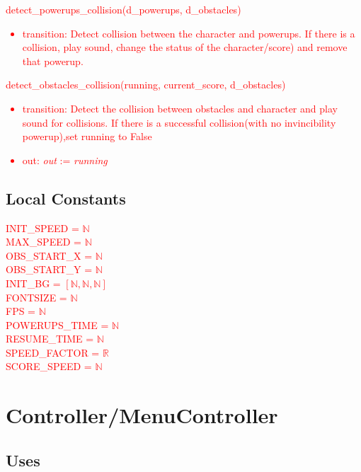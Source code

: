 \documentclass[12pt]{article}
\begin{document}
\noindent \textcolor{red}{
detect\_powerups\_collision(d\_powerups, d\_obstacles)
\begin{itemize}
    \item transition: Detect collision between the character and powerups. If there is a collision, play sound, change the status of the character/score) and remove that powerup.
\end{itemize}}

\noindent \textcolor{red}{
detect\_obstacles\_collision(running, current\_score, d\_obstacles)
\begin{itemize}
    \item transition: Detect the collision between obstacles and character and play sound for collisions. If there is a successful collision(with no invincibility powerup),set running to False
    \item out: \textit{out} := \textit{running}
\end{itemize}}

\subsection* {Local Constants}
\textcolor{red}{
    INIT\_SPEED =  $\mathbb{N}$ \\
    MAX\_SPEED =  $\mathbb{N}$ \\
    OBS\_START\_X =  $\mathbb{N}$ \\
    OBS\_START\_Y = $\mathbb{N}$ \\
    INIT\_BG = $[\mathbb{N,N,N}]$ \\
    FONTSIZE = $\mathbb{N}$ \\
    FPS = $\mathbb{N}$ \\
    POWERUPS\_TIME = $\mathbb{N}$ \\
    RESUME\_TIME = $\mathbb{N}$ \\
    SPEED\_FACTOR =  $\mathbb{R}$ \\
    SCORE\_SPEED = $\mathbb{N}$ \\
} 
\newpage
\section*{Controller/MenuController}

\subsection* {Uses}
\end{document}
